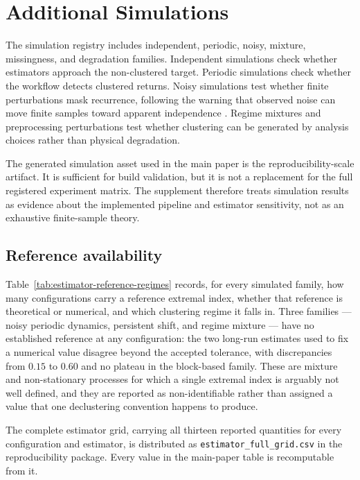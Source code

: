 \section{Additional Simulations}
\label{supp:simulations}

The simulation registry includes independent, periodic, noisy, mixture, missingness, and degradation families. Independent simulations check whether estimators approach the non-clustered target. Periodic simulations check whether the workflow detects clustered returns. Noisy simulations test whether finite perturbations mask recurrence, following the warning that observed noise can move finite samples toward apparent independence \citep{Faranda2013Noise}. Regime mixtures and preprocessing perturbations test whether clustering can be generated by analysis choices rather than physical degradation.

The generated simulation asset used in the main paper is the reproducibility-scale artifact. It is sufficient for build validation, but it is not a replacement for the full registered experiment matrix. The supplement therefore treats simulation results as evidence about the implemented pipeline and estimator sensitivity, not as an exhaustive finite-sample theory.

\subsection{Reference availability}
\label{supp:reference-availability}

Table~\ref{tab:estimator-reference-regimes} records, for every simulated family, how many configurations carry a reference extremal index, whether that reference is theoretical or numerical, and which clustering regime it falls in. Three families --- noisy periodic dynamics, persistent shift, and regime mixture --- have no established reference at any configuration: the two long-run estimates used to fix a numerical value disagree beyond the accepted tolerance, with discrepancies from \(0.15\) to \(0.60\) and no plateau in the block-based family. These are mixture and non-stationary processes for which a single extremal index is arguably not well defined, and they are reported as non-identifiable rather than assigned a value that one declustering convention happens to produce.



The complete estimator grid, carrying all thirteen reported quantities for every configuration and estimator, is distributed as \texttt{estimator\_full\_grid.csv} in the reproducibility package. Every value in the main-paper table is recomputable from it.

